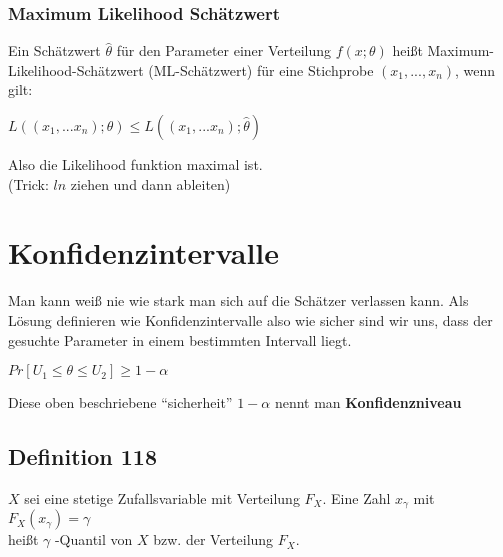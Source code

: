 \documentclass[11pt]{article}
\begin{document}
\subsubsection{Maximum Likelihood Schätzwert}
\label{sec:org8b6b707}
Ein Schätzwert \(\hat{\theta}\) für den Parameter einer Verteilung \(f(x; \theta)\) heißt Maximum-Likelihood-Schätzwert (ML-Schätzwert) für eine Stichprobe \((x_1,...,x_n)\), wenn gilt:
\begin{center}
\(L((x_1,...x_n); \theta) \leq L((x_1,...x_n); \hat{\theta})\)
\end{center}
Also die Likelihood funktion maximal ist. \\
(Trick: \(ln\) ziehen und dann ableiten)

\section{Konfidenzintervalle}
\label{sec:org1616c1c}
Man kann weiß nie wie stark man sich auf die Schätzer verlassen kann. Als Lösung definieren wie Konfidenzintervalle also wie sicher sind wir uns, dass der gesuchte Parameter in einem bestimmten Intervall liegt.
\begin{center}
\(Pr[U_1 \leq \theta \leq U_2] \geq 1 − \alpha\)
\end{center}
Diese oben beschriebene ``sicherheit'' \(1 - \alpha\) nennt man \textbf{Konfidenzniveau}

\subsection{Definition 118}
\label{sec:org3f34de9}
\(X\) sei eine stetige Zufallsvariable mit Verteilung \(F_X\). Eine Zahl \(x_\gamma\) mit \\
\(F_X(x_\gamma) =  \gamma\) \\
heißt \(\gamma\) -Quantil von \(X\) bzw. der Verteilung \(F_X\).
\end{document}
